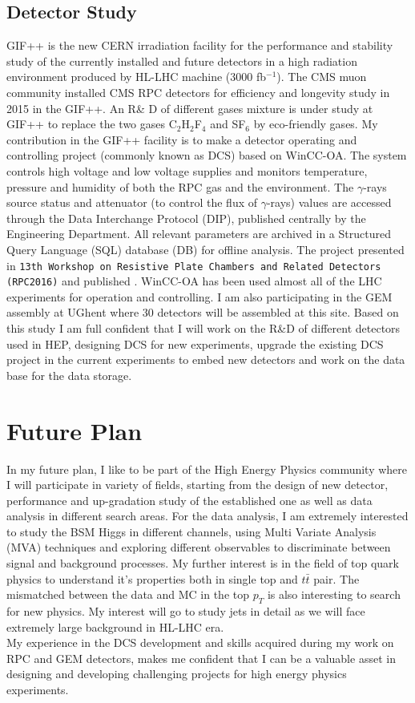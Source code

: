 \documentclass[12pt]{article}
\begin{document}
\subsection*{Detector Study}  
GIF++ is the new CERN irradiation facility for the performance and stability study of the currently installed and future detectors in a high radiation environment produced by HL-LHC machine (3000 fb$^{-1}$). The CMS muon community installed CMS RPC detectors for efficiency and longevity study in 2015 in the GIF++. An R\& D of different gases mixture is under study at GIF++ to replace the two gases C$_{2}$H$_{2}$F$_{4}$ and SF$_{6}$ by eco-friendly gases. My contribution in the GIF++ facility is to make a detector operating and controlling project (commonly known as DCS) based on WinCC-OA. The system controls high voltage and low voltage supplies and monitors temperature, pressure and humidity of both the RPC gas and the environment. The $\gamma$-rays source status and attenuator (to control the flux of $\gamma$-rays) values are accessed through the Data Interchange Protocol (DIP), published centrally by the Engineering Department. All relevant parameters are archived in a Structured Query Language (SQL) database (DB) for offline analysis. The project presented in \texttt{13th Workshop on Resistive Plate Chambers and Related Detectors (RPC2016)} and published \cite{fourth4}. WinCC-OA has been used almost all of the LHC experiments for operation and controlling. I am also participating in the GEM assembly at UGhent where 30 detectors will be assembled at this site. Based on this study I am full confident that I will work on the R\&D of different detectors used in HEP, designing DCS for new experiments, upgrade the existing DCS project in the current experiments to embed new detectors and work on the data base for the data storage.  
\section*{Future Plan}
In my future plan, I like to be part of the High Energy Physics community where I will participate in variety of fields, starting from the design of new detector, performance and up-gradation study of the established one as well as data analysis in different search areas. For the data analysis, I am extremely interested to study the BSM Higgs in different channels, using Multi Variate Analysis (MVA) techniques and exploring different observables to discriminate between signal and background processes. My further interest is in the field of top quark physics to understand it's properties both in single top and $t\bar t$ pair. The mismatched between the data and MC in the top $p_{T}$ is also interesting to search for new physics. My interest will go to study jets in detail as we will face extremely large background in HL-LHC era.\\   
My experience in the DCS development and skills acquired during my work on RPC and GEM detectors, makes me confident that I can be a valuable asset in designing and developing challenging projects for high energy physics experiments.\\
\end{document}
